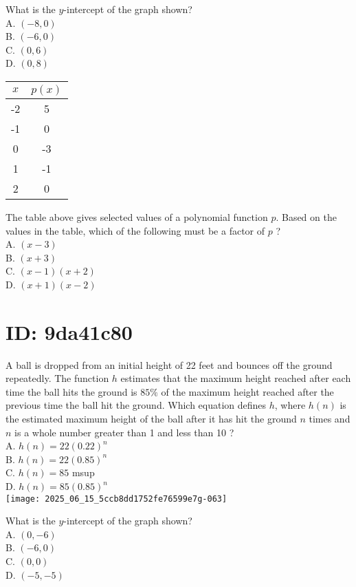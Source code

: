 What is the $y$-intercept of the graph shown?\\
A. $(-8,0)$\\
B. $(-6,0)$\\
C. $(0,6)$\\
D. $(0,8)$

\begin{center}
\begin{tabular}{|c|c|}
\hline
$x$ & $p(x)$ \\
\hline
-2 & 5 \\
\hline
-1 & 0 \\
\hline
0 & -3 \\
\hline
1 & -1 \\
\hline
2 & 0 \\
\hline
\end{tabular}
\end{center}

The table above gives selected values of a polynomial function $p$. Based on the values in the table, which of the following must be a factor of $p$ ?\\
A. $(x-3)$\\
B. $(x+3)$\\
C. $(x-1)(x+2)$\\
D. $(x+1)(x-2)$

\section*{ID: 9da41c80}
A ball is dropped from an initial height of 22 feet and bounces off the ground repeatedly. The function $h$ estimates that the maximum height reached after each time the ball hits the ground is $85 \%$ of the maximum height reached after the previous time the ball hit the ground. Which equation defines $h$, where $h(n)$ is the estimated maximum height of the ball after it has hit the ground $n$ times and $n$ is a whole number greater than 1 and less than 10 ?\\
A. $h(n)=22(0.22)^{n}$\\
B. $h(n)=22(0.85)^{n}$\\
C. $h(n)=85$ msup\\
D. $h(n)=85(0.85)^{n}$\\
\texttt{[image: 2025\_06\_15\_5ccb8dd1752fe76599e7g-063]}

What is the $y$-intercept of the graph shown?\\
A. $(0,-6)$\\
B. $(-6,0)$\\
C. $(0,0)$\\
D. $(-5,-5)$

